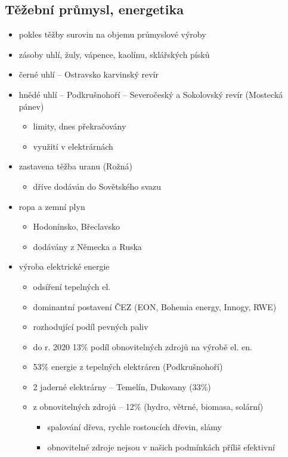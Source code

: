 \subsection{Těžební průmysl, energetika}
\begin{itemize}
\item pokles těžby surovin na objemu průmyslové výroby
\item zásoby uhlí, žuly, vápence, kaolínu, sklářských písků
\item černé uhlí -- Ostravsko karvinský revír
\item hnědé uhlí -- Podkrušnohoří -- Severočeský a Sokolovský revír (Mostecká pánev)
	\begin{itemize}
	\item limity, dnes překračovány
	\item využití v elektrárnách
	\end{itemize}
\item zastavena těžba uranu (Rožná) 
	\begin{itemize}
	\item dříve dodáván do Sovětského svazu
	\end{itemize}
\item  ropa a zemní plyn
	\begin{itemize}
	\item Hodonínsko, Břeclavsko
	\item dodávány z Německa a Ruska
	\end{itemize}
\item výroba elektrické energie
	\begin{itemize}
	\item odsíření tepelných el.
	\item dominantní postavení ČEZ (EON, Bohemia energy, Innogy, RWE)
	\item rozhodující podíl pevných paliv
	\item do r. 2020 13\% podíl obnovitelných zdrojů na výrobě el. en.
	\item 53\% energie z tepelných elektráren (Podkrušnohoří)
	\item 2 jaderné elektrárny -- Temelín, Dukovany (33\%)
	\item z obnovitelných zdrojů -- 12\% (hydro, větrné, biomasa, solární)
		\begin{itemize}
		\item spalování dřeva, rychle rostoucích dřevin, slámy
		\item obnovitelné zdroje nejsou v našich podmínkách příliš efektivní
		\end{itemize}
	\end{itemize}
\end{itemize}


